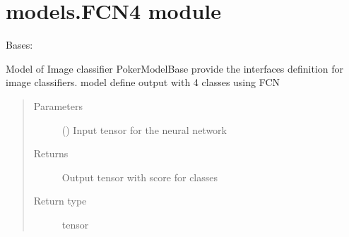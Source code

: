 \documentclass[letterpaper,10pt,english]{sphinxmanual}
\begin{document}
\section{models.FCN4 module}
\label{\detokenize{models:module-models.FCN4}}\label{\detokenize{models:models-fcn4-module}}

\begin{fulllineitems}
\label{\detokenize{models:models.FCN4.model}}
\pysigstartsignatures
{}
\pysigstopsignatures
\sphinxAtStartPar
Bases: {\hyperref[\detokenize{models:models.base_model.PokerModelBase}]{}}

\sphinxAtStartPar
Model of Image classifier
PokerModelBase provide the interfaces definition for image classifiers.
model define output with 4 classes using FCN

\begin{fulllineitems}
\label{\detokenize{models:models.FCN4.model.forward}}
\pysigstartsignatures
{}
\pysigstopsignatures\begin{quote}\begin{description}
\item[{Parameters}] \leavevmode
\sphinxAtStartPar
{} () \textendash{} Input tensor for the neural network

\item[{Returns}] \leavevmode
\sphinxAtStartPar
{} \textendash{} Output tensor with score for classes

\item[{Return type}] \leavevmode
\sphinxAtStartPar
tensor

\end{description}\end{quote}

\end{fulllineitems}


\end{fulllineitems}
\end{document}

